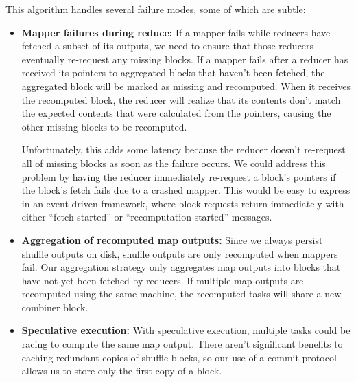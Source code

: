 \documentclass[12pt]{article}
\begin{document}
This algorithm handles several failure modes, some of which are subtle:

\begin{itemize}
   \item \textbf{Mapper failures during reduce:} If a mapper fails while
   reducers have fetched a subset of its outputs, we need to ensure that those
   reducers eventually re-request any missing blocks.  If a mapper fails after
   a reducer has received its pointers to aggregated blocks that haven't been
   fetched, the aggregated block will be marked as missing and recomputed.
   When it receives the recomputed block, the reducer will realize that its
   contents don't match the expected contents that were calculated from the
   pointers, causing the other missing blocks to be recomputed.

   Unfortunately, this adds some latency because the reducer doesn't
   re-request all of missing blocks as soon as the failure occurs.  We could
   address this problem by having the reducer immediately re-request a block's
   pointers if the block's fetch fails due to a crashed mapper.  This would be
   easy to express in an event-driven framework, where block requests return
   immediately with either ``fetch started'' or ``recomputation started''
   messages.

   \item \textbf{Aggregation of recomputed map outputs:} Since we always
   persist shuffle outputs on disk, shuffle outputs are only recomputed when
   mappers fail.  Our aggregation strategy only aggregates map outputs into
   blocks that have not yet been fetched by reducers.  If multiple map outputs
   are recomputed using the same machine, the recomputed tasks will share
   a new combiner block.

   \item \textbf{Speculative execution:} With speculative execution, multiple
   tasks could be racing to compute the same map output.  There aren't
   significant benefits to caching redundant copies of shuffle blocks, so our
   use of a commit protocol allows us to store only the first copy of a block.




\end{itemize}
\end{document}
